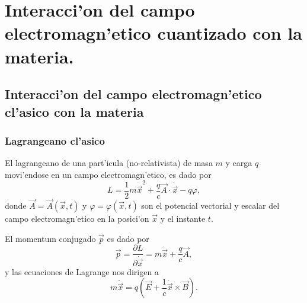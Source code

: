 \chapter{Interacci'on del campo electromagn'etico cuantizado con la
materia.}

\section{Interacci'on del campo electromagn'etico cl'asico con la
materia}
\subsection{Lagrangeano cl'asico}
El lagrangeano de una part'icula (no-relativista) de masa $m$ y carga $q$
movi'endose en un campo electromagn'etico, es dado por 
\begin{equation}
L=\frac{1}{2}m\dot{\vec{x}}^2+\frac{q}{c}\vec{A}\cdot \dot{\vec{x}}-q\varphi ,
\label{lagc}
\end{equation}
donde $\vec{A}=\vec{A}\left( \vec{x},t\right) $ y $\varphi =\varphi
\left( \vec{x},t\right) $ son el potencial vectorial y escalar del campo
electromagn'etico en la posici'on $\vec{x}$ y el instante $t$.

El momentum conjugado $\vec{p}$ es dado por 
\begin{equation}
\vec{p}=\frac{\partial L}{\partial
\dot{\vec{x}}}=m\dot{\vec{x}}+\frac{q}{c}\vec{A} \label{pc},
\end{equation}
y las ecuaciones de Lagrange nos dirigen a 
\begin{equation}
m \ddot{\vec{x}}=q\left( \vec{E}+\frac{1}{c}\dot{\vec{x}}\times
\vec{B}\right) .
\end{equation}

